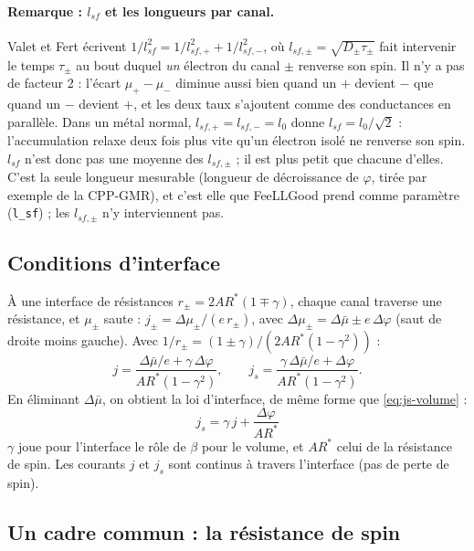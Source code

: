 \documentclass[11pt,a4paper]{article}
\begin{document}
\paragraph{Remarque : $l_{sf}$ et les longueurs par canal.} Valet et Fert
écrivent $1/l_{sf}^2 = 1/l_{sf,+}^2 + 1/l_{sf,-}^2$, où
$l_{sf,\pm} = \sqrt{D_\pm\tau_\pm}$ fait intervenir le temps $\tau_\pm$ au
bout duquel \emph{un} électron du canal $\pm$ renverse son spin. Il n'y a
pas de facteur 2 : l'écart $\mu_+-\mu_-$ diminue aussi bien quand un $+$
devient $-$ que quand un $-$ devient $+$, et les deux taux s'ajoutent comme
des conductances en parallèle. Dans un métal normal, $l_{sf,+} = l_{sf,-} =
l_0$ donne $l_{sf} = l_0/\sqrt2$ : l'accumulation relaxe deux fois plus vite
qu'un électron isolé ne renverse son spin. $l_{sf}$ n'est donc pas une
moyenne des $l_{sf,\pm}$ ; il est plus petit que chacune d'elles. C'est la
seule longueur mesurable (longueur de décroissance de $\varphi$, tirée par
exemple de la CPP-GMR), et c'est elle que FeeLLGood prend comme paramètre
(\texttt{l\_sf}) ; les $l_{sf,\pm}$ n'y interviennent pas.

\subsection{Conditions d'interface}

À une interface de résistances $r_\pm = 2AR^*(1\mp\gamma)$, chaque canal
traverse une résistance, et $\mu_\pm$ saute :
$j_\pm = \Delta\mu_\pm/(e\,r_\pm)$, avec $\Delta\mu_\pm = \Delta\bar\mu \pm
e\,\Delta\varphi$ (saut de droite moins gauche). Avec
$1/r_\pm = (1\pm\gamma)/\left(2AR^*(1-\gamma^2)\right)$ :
\begin{equation}
  j = \frac{\Delta\bar\mu/e + \gamma\,\Delta\varphi}{AR^*(1-\gamma^2)},
  \qquad
  j_s = \frac{\gamma\,\Delta\bar\mu/e + \Delta\varphi}{AR^*(1-\gamma^2)} .
\end{equation}
En éliminant $\Delta\bar\mu$, on obtient la loi d'interface, de même
forme que \eqref{eq:js-volume} :
\begin{equation}
  \boxed{\;j_s = \gamma\,j + \frac{\Delta\varphi}{AR^*}\;}
  \label{eq:js-interface}
\end{equation}
$\gamma$ joue pour l'interface le rôle de $\beta$ pour le volume, et
$AR^*$ celui de la résistance de spin. Les courants $j$ et $j_s$ sont
continus à travers l'interface (pas de perte de spin).

\subsection{Un cadre commun : la résistance de spin}
\end{document}
